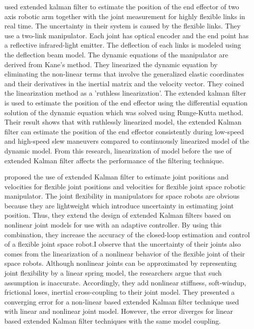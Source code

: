 \textcite{Lertpiriyasuwat2000} used extended kalman
filter to estimate the position 
of the end effector of two axis robotic arm together with the joint measurement 
for highly flexible links in real time. The uncertainty in their system is caused 
by the flexible links. They use a two-link manipulator. 
Each joint has optical encoder and the end point has a reflective 
infrared-light emitter. The deflection of each links is modeled using the deflection beam model. 
The dynamic equations of the manipulator are derived from Kane's method. 
They linearized the dynamic equation by eliminating the non-linear terms 
that involve the generalized elastic coordinates and their derivatives in the 
inertial matrix and the velocity vector. 
They coined the linearization method as a 'ruthless linearization'. 
The extended kalman filter is used to estimate the position of 
the end effector using the differential equation solution of 
the dynamic equation which was solved using Runge-Kutta method. 
Their result shows that with ruthlessly linearized model, 
the extended Kalman filter can estimate the position of 
the end effector consistently during low-speed and 
high-speed slew maneuvers compared to continuously linearized 
model of the dynamic model. 
From this research, linearization of model before the use of 
extended Kalman filter affects the performance of the filtering technique.

\textcite{Ulrich2011} proposed the use of extended Kalman filter to 
estimate joint positions and velocities for flexible joint positions 
and velocities for flexible joint space robotic manipulator. 
The joint flexibility in manipulators for space robots are 
obvious because they are lightweight which introduce uncertainty 
in estimating joint position. 
Thus, they extend the design of extended Kalman filters based on 
nonlinear joint models for use with an adaptive controller.
By using this combination, they increase the accuracy of 
the closed-loop estimation and control
of a flexible joint space robot.I observe that the uncertainty of 
their joints also comes from
the linearization of a nonlinear behavior of the flexible 
joint of their space robots. Although
nonlinear joints can be approximated by representing joint 
flexibility by a linear spring model, the
researchers argue that such assumption is inaccurate. 
Accordingly, they add nonlinear stiffness,
soft-windup, frictional loses, inertial cross-coupling 
to their joint model. They presented a
converging error for a non-linear based extended Kalman 
filter technique used with linear and
nonlinear joint model. However, the error diverges for 
linear based extended Kalman filter
techniques with the same model coupling.

